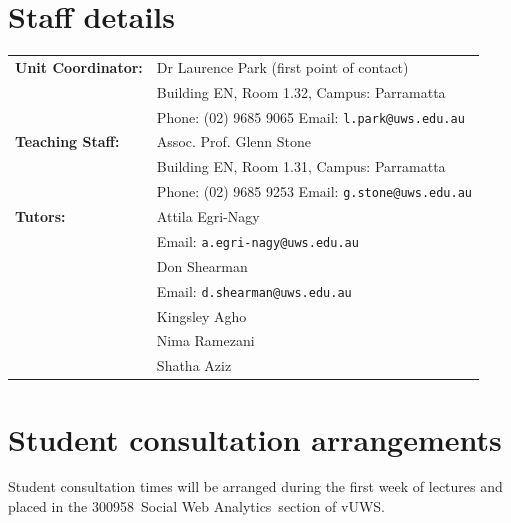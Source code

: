 \documentclass[a4paper,oneside]{book}
\newcommand{\vuws}{vUWS}
\newcommand{\unitcode}{300958}
\newcommand{\unitname}{Social Web Analytics}
\begin{document}



\section{Staff details}
\begin{tabular}{ll}
  \textbf{Unit Coordinator:}  & Dr Laurence Park (first point of
  contact) \\
  & Building EN, Room 1.32, Campus: Parramatta \\
  & Phone: (02) 9685 9065 \quad
  Email: \texttt{l.park@uws.edu.au} \\[0.5em]

  \textbf{Teaching Staff:} & Assoc. Prof. Glenn Stone \\
  & Building EN, Room 1.31, Campus: Parramatta \\
  & Phone: (02) 9685 9253 \quad
  Email: \texttt{g.stone@uws.edu.au} \\[0.5em]

  \textbf{Tutors:} & Attila Egri-Nagy \\
  & Email: \texttt{a.egri-nagy@uws.edu.au} \\[0.5em]

  & Don Shearman \\
  & Email: \texttt{d.shearman@uws.edu.au} \\[0.5em] 
  
  & Kingsley Agho \\[0.5em] 

  & Nima Ramezani \\[0.5em] 

  & Shatha Aziz
\end{tabular}


\section{Student consultation arrangements}

Student consultation times will be arranged during the first week of
lectures and placed in the \unitcode~\unitname~section of \vuws.
\end{document}
